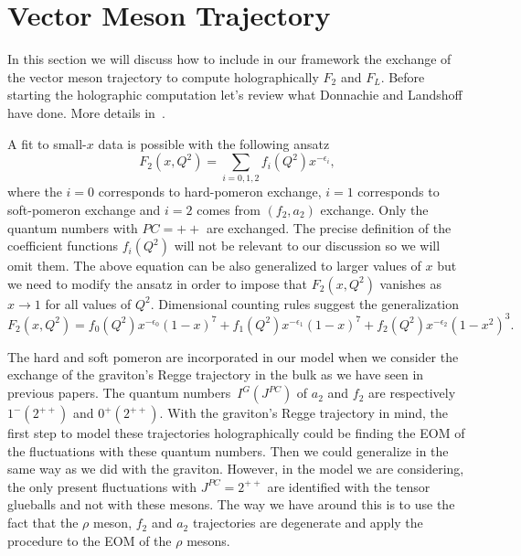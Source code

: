 \documentclass[a4paper,12pt]{article}
\begin{document}
\section{Vector Meson Trajectory}

In this section we will discuss how to include in our framework the exchange of the vector meson trajectory to compute holographically $F_2$ and $F_L$. Before starting the holographic computation let's review what Donnachie and Landshoff have done. More details in~\cite{donnachie_dosch_landshoff_nachtmann_2002}.

A fit to small-$x$ data is possible with the following ansatz
\begin{equation}
F_2 \left(x, Q^2\right) = \sum_{i = 0, 1, 2} f_i\left(Q^2\right) x^{- \epsilon_i},
\end{equation}
 where the $i=0$ corresponds to hard-pomeron exchange, $i=1$ corresponds to soft-pomeron exchange and $i = 2$ comes from $(f_2, a_2)$ exchange. Only the quantum numbers with $PC=++$ are exchanged.
 The precise definition of the coefficient functions $f_i\left(Q^2\right)$ will not be relevant to our discussion so we will omit them. The above equation can be also generalized to larger values of $x$ but we need to modify the ansatz in order to impose that $F_2\left(x, Q^2\right)$ vanishes as $x \rightarrow 1$ for all values of $Q^2$. Dimensional counting rules suggest the generalization
\begin{equation}
F_2\left(x, Q^2\right) = f_0 \left(Q^2\right) x^{-\epsilon_0} {\left(1-x\right)}^7 +  f_1 \left(Q^2\right) x^{-\epsilon_1} {\left(1-x\right)}^7 +  f_2 \left(Q^2\right) x^{-\epsilon_2} {\left(1-x^2\right)}^3.
\end{equation} 

The hard and soft pomeron are incorporated in our model when we consider the exchange of the graviton's Regge trajectory in the bulk as we have seen in previous papers. The quantum numbers~$I^G\left(J^{PC}\right)$ of $a_2$ and $f_2$ are respectively $1^{-} \left(2^{++}\right)$ and $0^{+}\left(2^{++}\right)$. With the graviton's Regge trajectory in mind, the first step to model these trajectories holographically could be finding the EOM of the fluctuations with these quantum numbers. Then we could generalize in the same way as we did with the graviton. However, in the model we are considering, the only present fluctuations with $J^{PC} = 2^{++}$ are identified with the tensor glueballs and not with these mesons. The way we have around this is to use the fact that the $\rho$ meson, $f_2$ and $a_2$ trajectories are degenerate and apply the procedure to the EOM of the $\rho$ mesons.
\end{document}
